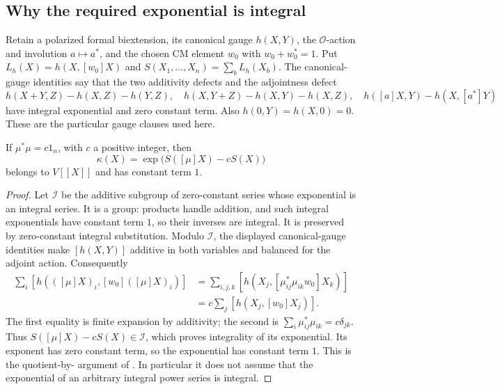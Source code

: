 \subsection{Why the required exponential is integral}
\label{subsec:ftb-integral-kappa}

Retain a polarized formal biextension, its canonical gauge \(h(X,Y)\),
the \(\mathcal O\)-action and involution \(a\mapsto a^*\), and the
chosen CM element \(w_0\) with \(w_0+w_0^*=1\).
Put \(L_h(X)=h(X,[w_0]X)\) and
\(S(X_1,\ldots,X_n)=\sum_bL_h(X_b)\).
The canonical-gauge identities say that the two additivity defects
and the adjointness defect
\[
 h(X+Y,Z)-h(X,Z)-h(Y,Z),\quad
 h(X,Y+Z)-h(X,Y)-h(X,Z),\quad
 h([a]X,Y)-h(X,[a^*]Y)
\]
have integral exponential and zero constant term.
Also \(h(0,Y)=h(X,0)=0\).
These are the particular gauge clauses used here.

\begin{srlemma}\label{lem:ftb-kappa}
If \(\mu^*\mu=c1_n\), with \(c\) a positive integer, then
\[
       \kappa(X)=\exp\bigl(S([\mu]X)-cS(X)\bigr)
\]
belongs to \(V[[X]]\) and has constant term \(1\).
\end{srlemma}
\begin{proof}
Let \(\mathcal I\) be the additive subgroup of zero-constant series
whose exponential is an integral series.
It is a group: products handle addition, and such integral
exponentials have constant term \(1\), so their inverses are integral.
It is preserved by zero-constant integral substitution.
Modulo \(\mathcal I\), the displayed canonical-gauge identities make
\([h(X,Y)]\) additive in both variables and balanced for the adjoint
action.  Consequently
\[
 \begin{split}
 \sum_i[h(([\mu]X)_i,[w_0]([\mu]X)_i)]
 &=\sum_{i,j,k}[h(X_j,[\mu_{ij}^*\mu_{ik}w_0]X_k)]\\
 &=c\sum_j[h(X_j,[w_0]X_j)] .
 \end{split}
\]
The first equality is finite expansion by additivity; the second is
\(\sum_i\mu_{ij}^*\mu_{ik}=c\delta_{jk}\).
Thus \(S([\mu]X)-cS(X)\in\mathcal I\), which proves integrality of its
exponential.  Its exponent has zero constant term, so the exponential
has constant term \(1\).
This is the quotient-by- argument of
.
In particular it does not assume that the exponential of an arbitrary
integral power series is integral.
\end{proof}

